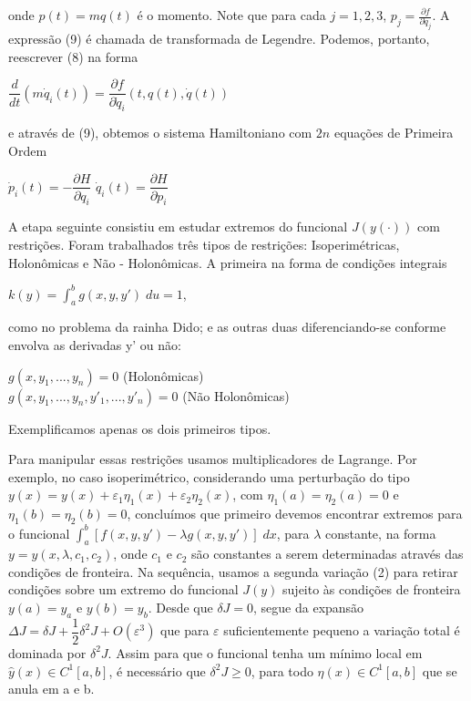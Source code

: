 \documentclass[12pt, a4paper]{article}
\begin{document}
onde $p(t) = mq(t)$ é o momento. Note que para cada $j = 1,2,3$, $p_j=  \frac{\partial f}{\partial \dot{q}_j}$. A expressão (9) é chamada de transformada de Legendre. Podemos, portanto, reescrever (8) na forma

\begin{center}
$\dfrac{d}{dt}(m\dot{q}_i(t)) = \dfrac{\partial f}{\partial \dot{q}_i}(t, q(t), \dot{q}(t))$
\end{center}

e através de (9), obtemos o sistema Hamiltoniano com $2n$ equações de Primeira Ordem

\begin{center}
$\dot{p}_i(t)= -\dfrac{\partial H}{\partial q_i} $
$\dot{q}_i(t)=  \dfrac{\partial H}{\partial p_i} $

\end{center}


A etapa seguinte consistiu em estudar extremos do funcional $J(y(\cdot))$ com restrições. Foram trabalhados três tipos de restrições: Isoperimétricas, Holonômicas e Não - Holonômicas. A primeira na forma de condições integrais

\begin{center}
$k(y) = \int_a^b g(x, y, y') \; du = 1$,
\end{center}

como no problema da rainha Dido; e as outras duas diferenciando-se conforme envolva as derivadas y' ou não: 

\begin{center}
$g(x,y_1,...,y_n) = 0 $ (Holonômicas)\\
$g(x,y_1,...,y_n, y'_1,...,y'_n) = 0 $ (Não Holonômicas)
\end{center}

Exemplificamos apenas os dois primeiros tipos.

Para manipular essas restrições usamos multiplicadores de Lagrange. Por exemplo, no caso isoperimétrico, considerando uma perturbação do tipo $y(x)=y(x)+ \varepsilon_1 \eta_1 (x)+ \varepsilon_2 \eta_2 (x)$, com $\eta_1(a)=\eta_2(a) = 0$ e $\eta_1(b)=\eta_2(b)= 0$, concluímos que primeiro devemos encontrar extremos para o funcional $\int_a^b[f(x,y,y') - \lambda g(x,y,y')]\; dx$, para $\lambda$ constante, na forma $y=y(x,\lambda,c_1,c_2)$, onde $c_1$  e  $c_2$ são constantes a serem determinadas através das condições de fronteira. Na sequência, usamos a segunda variação (2) para retirar condições sobre um extremo do funcional $J(y)$ sujeito às condições de fronteira $y(a)= y_a$ e $ y(b) = y_b$. Desde que $\delta J=0$, segue da expansão $\Delta J= \delta J+\dfrac{1}{2} \delta^2 J+O(\varepsilon^3)$ que para $\varepsilon$ suficientemente pequeno a variação total é dominada por $\delta^2 J$. Assim para que o funcional tenha um mínimo local em $\hat{y}(x) \in C^1 [a,b]$, é necessário que $\delta^2 J \ge 0$, para todo $\eta(x) \in C^1 [a,b]$ que se anula em a e b.
\end{document}
